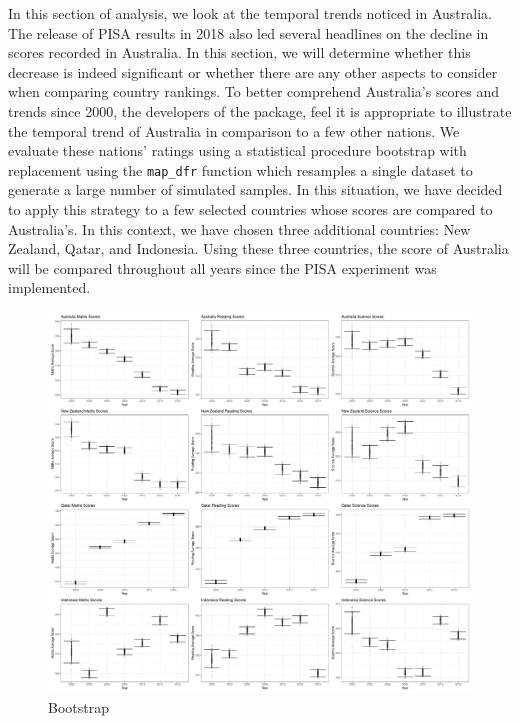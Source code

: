 In this section of analysis, we look at the temporal trends noticed in
Australia. The release of PISA results in 2018 also led several
headlines on the decline in scores recorded in Australia. In this
section, we will determine whether this decrease is indeed significant
or whether there are any other aspects to consider when comparing
country rankings. To better comprehend Australia's scores and trends
since 2000, the developers of the  package, feel
it is appropriate to illustrate the temporal trend of Australia in
comparison to a few other nations. We evaluate these nations' ratings
using a statistical procedure bootstrap with replacement using the
\texttt{map\_dfr} function which resamples a single dataset to generate
a large number of simulated samples. In this situation, we have decided
to apply this strategy to a few selected countries whose scores are
compared to Australia's. In this context, we have chosen three
additional countries: New Zealand, Qatar, and Indonesia. Using these
three countries, the score of Australia will be compared throughout all
years since the PISA experiment was implemented.

\begin{Schunk}
\begin{figure}[H]
\includegraphics[width=1\linewidth]{learningtower_files/figure-latex/bs-plot-1} \caption[Bootstrap]{Bootstrap}\label{fig:bs-plot}
\end{figure}
\end{Schunk}

